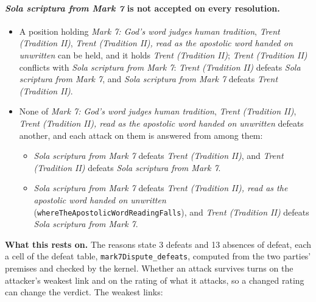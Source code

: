 \documentclass[11pt]{article}
\begin{document}
\paragraph{\emph{Sola scriptura from Mark 7} is not accepted on every resolution.}
\begin{itemize}
\item A position holding \emph{Mark 7: God’s word judges human tradition}, \emph{Trent (Tradition II)}, \emph{Trent (Tradition II), read as the apostolic word handed on unwritten} can be held, and it holds \emph{Trent (Tradition II)}; \emph{Trent (Tradition II)} conflicts with \emph{Sola scriptura from Mark 7}: \emph{Trent (Tradition II)} defeats \emph{Sola scriptura from Mark 7}, and \emph{Sola scriptura from Mark 7} defeats \emph{Trent (Tradition II)}.
\item None of \emph{Mark 7: God’s word judges human tradition}, \emph{Trent (Tradition II)}, \emph{Trent (Tradition II), read as the apostolic word handed on unwritten} defeats another, and each attack on them is answered from among them:
\begin{itemize}
\item \emph{Sola scriptura from Mark 7} defeats \emph{Trent (Tradition II)}, and \emph{Trent (Tradition II)} defeats \emph{Sola scriptura from Mark 7}.
\item \emph{Sola scriptura from Mark 7} defeats \emph{Trent (Tradition II), read as the apostolic word handed on unwritten} (\texttt{where\allowbreak{}The\allowbreak{}Apostolic\allowbreak{}Word\allowbreak{}Reading\allowbreak{}Falls}), and \emph{Trent (Tradition II)} defeats \emph{Sola scriptura from Mark 7}.
\end{itemize}
\end{itemize}
\par\noindent\textbf{What this rests on.} The reasons state 3 defeats and 13 absences of defeat, each a cell of the defeat table, \texttt{mark7\allowbreak{}Dispute\_\allowbreak{}defeats}, computed from the two parties' premises and checked by the kernel. Whether an attack survives turns on the attacker's weakest link and on the rating of what it attacks, so a changed rating can change the verdict. The weakest links:
\end{document}
